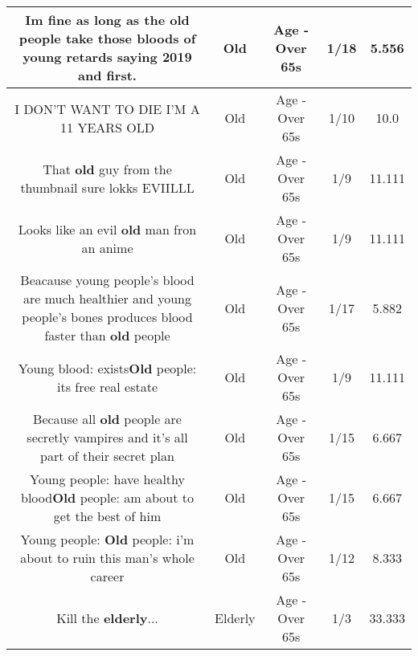 \documentclass[11pt]{article}
\newlength\mylength
\begin{document}
\begin{center}
\begin{longtable}{|C{.65\mylength}|C{.30\mylength}|C{.12\mylength}|C{.12\mylength}|C{.12\mylength}|}
  \small Im fine as long as the \textbf{old} people take those bloods of young retards saying 2019 and first.\normalsize   & Old & Age - Over 65s & 1/18 & 5.556 \\  \hline
  \small I DON'T WANT TO DIE I'M A 11 YEARS OLD\normalsize   & Old & Age - Over 65s & 1/10 & 10.0 \\  \hline
  \small That \textbf{old} guy from the thumbnail sure lokks EVIILLL\normalsize   & Old & Age - Over 65s & 1/9 & 11.111 \\  \hline
  \small Looks like an evil \textbf{old} man fron an anime\normalsize   & Old & Age - Over 65s & 1/9 & 11.111 \\  \hline
  \small Beacause young people's blood are much healthier and young people's bones produces blood faster than \textbf{old} people\normalsize   & Old & Age - Over 65s & 1/17 & 5.882 \\  \hline
  \small Young blood: exists\textbf{Old} people: its free real estate\normalsize   & Old & Age - Over 65s & 1/9 & 11.111 \\  \hline
  \small Because all \textbf{old} people are secretly vampires and it's all part of their secret plan\normalsize   & Old & Age - Over 65s & 1/15 & 6.667 \\  \hline
  \small Young people: have healthy blood\textbf{Old} people: am about to get the best of him\normalsize   & Old & Age - Over 65s & 1/15 & 6.667 \\  \hline
  \small Young people: \textbf{Old} people: i'm about to ruin this man's whole career\normalsize   & Old & Age - Over 65s & 1/12 & 8.333 \\  \hline
  \small Kill the \textbf{elderly}...\normalsize   & Elderly & Age - Over 65s & 1/3 & 33.333 \\  \hline

\end{longtable}
\end{center}
\end{document}
